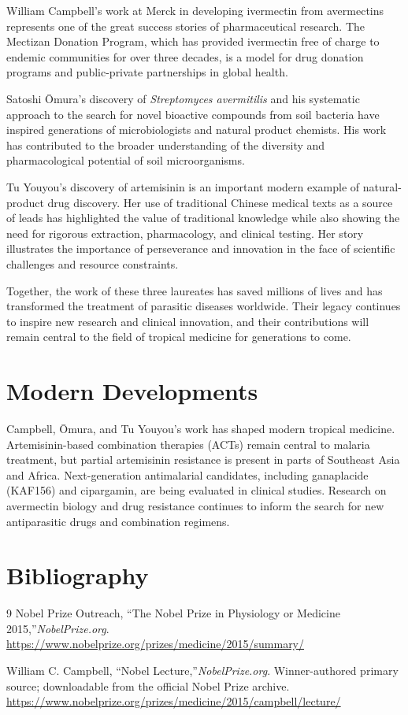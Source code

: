 William Campbell's work at Merck in developing ivermectin from avermectins represents one of the great success stories of pharmaceutical research. The Mectizan Donation Program, which has provided ivermectin free of charge to endemic communities for over three decades, is a model for drug donation programs and public-private partnerships in global health.

Satoshi \=Omura's discovery of \textit{Streptomyces avermitilis} and his systematic approach to the search for novel bioactive compounds from soil bacteria have inspired generations of microbiologists and natural product chemists. His work has contributed to the broader understanding of the diversity and pharmacological potential of soil microorganisms.

Tu Youyou's discovery of artemisinin is an important modern example of natural-product drug discovery. Her use of traditional Chinese medical texts as a source of leads has highlighted the value of traditional knowledge while also showing the need for rigorous extraction, pharmacology, and clinical testing. Her story illustrates the importance of perseverance and innovation in the face of scientific challenges and resource constraints.

Together, the work of these three laureates has saved millions of lives and has transformed the treatment of parasitic diseases worldwide. Their legacy continues to inspire new research and clinical innovation, and their contributions will remain central to the field of tropical medicine for generations to come.


\section{Modern Developments}

Campbell, Ōmura, and Tu Youyou's work has shaped modern tropical medicine. Artemisinin-based combination therapies (ACTs) remain central to malaria treatment, but partial artemisinin resistance is present in parts of Southeast Asia and Africa. Next-generation antimalarial candidates, including ganaplacide (KAF156) and cipargamin, are being evaluated in clinical studies. Research on avermectin biology and drug resistance continues to inform the search for new antiparasitic drugs and combination regimens.


\section{Bibliography}

\begin{thebibliography}{9}
Nobel Prize Outreach, ``The Nobel Prize in Physiology or Medicine 2015,''\emph{NobelPrize.org}.\\
\url{https://www.nobelprize.org/prizes/medicine/2015/summary/}

William C. Campbell, ``Nobel Lecture,''\emph{NobelPrize.org}. Winner-authored primary source; downloadable from the official Nobel Prize archive.\\
\url{https://www.nobelprize.org/prizes/medicine/2015/campbell/lecture/}
\end{thebibliography}
